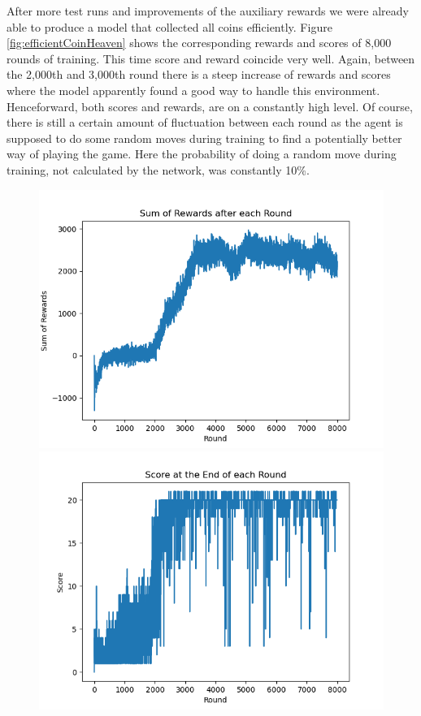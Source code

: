 After more test runs and improvements of the auxiliary rewards we were already able to produce a model that collected all coins efficiently. Figure \ref{fig:efficientCoinHeaven} shows the corresponding rewards and scores of 8,000 rounds of training. This time score and reward coincide very well. Again, between the 2,000th and 3,000th round there is a steep increase of rewards and scores where the model apparently found a good way to handle this environment. Henceforward, both scores and rewards, are on a constantly high level. Of course, there is still a certain amount of fluctuation between each round as the agent is supposed to do some random moves during training to find a potentially better way of playing the game. Here the probability of doing a random move during training, not calculated by the network, was constantly 10\%.
\begin{figure}[H]
	\centering
	\begin{minipage}{0.49\textwidth}
		\centering
		\includegraphics[scale=0.52]{images/rewards_perfect_coinheaven.png}
	\end{minipage}
	\begin{minipage}{0.49\textwidth}
		\centering
		\includegraphics[scale=0.52]{images/scores_perfect_coinheaven.png}

\end{minipage}
\end{figure}
